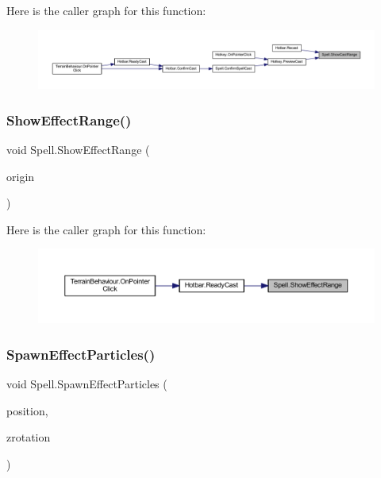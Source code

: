 Here is the caller graph for this function\+:\nopagebreak
\begin{figure}[H]
\begin{center}
\leavevmode
\includegraphics[width=350pt]{class_spell_ad49f8d3af9c5a885120ca85b510eae75_icgraph}
\end{center}
\end{figure}
\mbox{\label{class_spell_af7f2944573b064a7f561227d6f6fc601}} 
\subsubsection{\texorpdfstring{ShowEffectRange()}{ShowEffectRange()}}
{\footnotesize\ttfamily void Spell.\+Show\+Effect\+Range (\begin{DoxyParamCaption}\item[{Vector2\+Int}]{origin }\end{DoxyParamCaption})}

Here is the caller graph for this function\+:\nopagebreak
\begin{figure}[H]
\begin{center}
\leavevmode
\includegraphics[width=350pt]{class_spell_af7f2944573b064a7f561227d6f6fc601_icgraph}
\end{center}
\end{figure}
\mbox{\label{class_spell_ac96caa87a4e57a75bd70672a7cd9b83c}} 
\subsubsection{\texorpdfstring{SpawnEffectParticles()}{SpawnEffectParticles()}}
{\footnotesize\ttfamily void Spell.\+Spawn\+Effect\+Particles (\begin{DoxyParamCaption}\item[{Vector2\+Int}]{position,  }\item[{float}]{zrotation }\end{DoxyParamCaption})}


